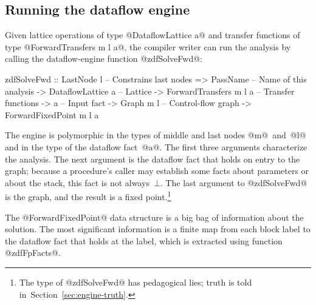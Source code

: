 \documentclass[blockstyle,preprint,nocopyrightspace]{sigplanconf}
\newcommand{\authornote}[1]{{\em #1}}
\def\authornote#1{\unskip\relax}
\newcommand{\norman}[1]{\authornote{NR: #1}}
\let\remark\norman
\newcommand\secref[1]{Section~\ref{sec:#1}}
\newcommand\seclabel[1]{\label{sec:#1}}
\begin{document}
\subsection{Running the dataflow engine}

\seclabel{zdfSolveFwd}

Given lattice operations of type @DataflowLattice a@
and transfer functions of type @ForwardTransfers m l a@,
the compiler writer can run the analysis by calling the
dataflow-engine function @zdfSolveFwd@:
\begin{code}
 zdfSolveFwd 
  :: LastNode l             -- Constrains last nodes
  => PassName               -- Name of this analysis
  -> DataflowLattice a      -- Lattice
  -> ForwardTransfers m l a -- Transfer functions
  -> a                      -- Input fact
  -> Graph m l              -- Control-flow graph
  -> ForwardFixedPoint m l a
\end{code}
The engine is polymorphic in the types of middle and last nodes
@m@~and~@l@ and in the type of the dataflow fact~@a@.
The first three arguments characterize the analysis.
The next argument is the dataflow fact that holds on entry to the
graph;
because a procedure's caller may establish some facts about
parameters or about the stack,
this fact
is not always~$\bot$.
The last argument to @zdfSolveFwd@ is the graph, and the result is a 
fixed point.\footnote
{The type of @zdfSolveFwd@ has pedagogical lies;
truth is told in~\secref{engine-truth}.}\remark{One of the lies is
that I've deliberately conflated the three representations of graphs.}

The @ForwardFixedPoint@ data structure is a big bag
of information about the solution.
The most significant information is
a finite map from each block label to the dataflow fact that holds at
the label, which is extracted using function @zdfFpFacts@.






\iffalse
\begin{code}
class DataflowSolverDirection
        transfers fixedpt where
  zdfSolveFrom :: (DebugNodes m l, Outputable a)
    => BlockEnv a        -- Init facts
    -> PassName          -- Analysis name
    -> DataflowLattice a -- Lattice
    -> transfers m l a   -- Transfers
    -> a                 -- Input fact
    -> Graph m l         -- CFG
    -> DFMonad (fixedpt m l a ())
\end{code}
\fi
\end{document}

